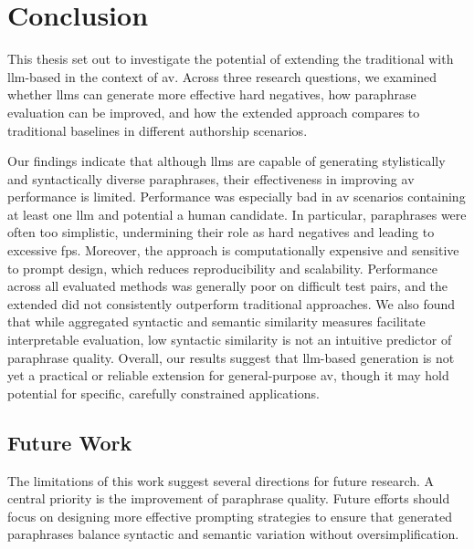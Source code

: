 \chapter{Conclusion}
\label{chap:conclusion}

This thesis set out to investigate the potential of extending the traditional \impAppr{} with \ac{llm}-based \imps{} in the context of \ac{av}. 
Across three research questions, we examined whether \acp{llm} can generate more effective hard negatives, how paraphrase evaluation can be improved, and how the extended approach compares to traditional baselines in different authorship scenarios. 

Our findings indicate that although \acp{llm} are capable of generating stylistically and syntactically diverse paraphrases, their effectiveness in improving \ac{av} performance is limited. 
Performance was especially bad in \ac{av} scenarios containing at least one \ac{llm} and potential a human candidate.
In particular, paraphrases were often too simplistic, undermining their role as hard negatives and leading to excessive \acp{fp}. 
Moreover, the approach is computationally expensive and sensitive to prompt design, which reduces reproducibility and scalability. 
Performance across all evaluated methods was generally poor on difficult test pairs, and the extended \impAppr{} did not consistently outperform traditional approaches. 
We also found that while aggregated syntactic and semantic similarity measures facilitate interpretable evaluation, low syntactic similarity is not an intuitive predictor of paraphrase quality. 
Overall, our results suggest that \ac{llm}-based \imp{} generation is not yet a practical or reliable extension for general-purpose \ac{av}, though it may hold potential for specific, carefully constrained applications.


\section{Future Work}

The limitations of this work suggest several directions for future research. 
A central priority is the improvement of paraphrase quality. 
Future efforts should focus on designing more effective prompting strategies to ensure that generated paraphrases balance syntactic and semantic variation without oversimplification. 

